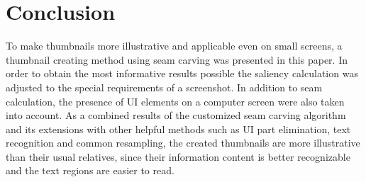 \documentclass[draft,final]{vutinfth} %
\begin{document}
	\chapter{Conclusion}
	To make thumbnails more illustrative and applicable even on small screens, a thumbnail creating method using seam carving was presented in this paper.
	In order to obtain the most informative results possible the saliency calculation was adjusted to the special requirements of a screenshot.
	In addition to seam calculation, the presence of UI elements on a computer screen were also taken into account.
	As a combined results of the customized seam carving algorithm and its extensions with other helpful methods such as UI part elimination, text recognition and common resampling, the created thumbnails are more illustrative than their usual relatives, since their information content is better recognizable and the text regions are easier to read. 
	
	
	\backmatter
	
	\listoffigures %
	
	\cleardoublepage %
	\listoftables %
	
	\listofalgorithms
	
	\printindex
	
	\printglossaries
	
	
	
	
\end{document}
